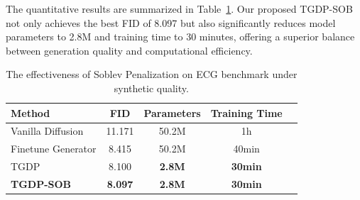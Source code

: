 \documentclass[11pt]{article}
\theoremstyle{plain}
\theoremstyle{definition}
\theoremstyle{remark}
\begin{document}
The quantitative results are summarized in Table~\ref{tab:ecg_quality}. Our proposed TGDP-SOB not only achieves the best FID of 8.097 but also significantly reduces model parameters to 2.8M and training time to 30 minutes, offering a superior balance between generation quality and computational efficiency.

\begin{table}[htbp]
\centering
\caption{The effectiveness of Soblev Penalization on ECG benchmark under synthetic quality.}\label{tab:ecg_quality}
\begin{tabular}{l|c|c|c|c}
\hline
\textbf{Method}
& \textbf{FID}
& \textbf{Parameters}
& \textbf{Training Time} \\
\hline
Vanilla Diffusion       & 11.171 & 50.2M & 1h \\
Finetune Generator      & 8.415 & 50.2M & 40min \\
TGDP          & 8.100 & \textbf{2.8M} &
\textbf{30min} \\
\textbf{TGDP-SOB}  &\textbf{8.097} & \textbf{2.8M} &
\textbf{30min} \\
\hline
\end{tabular}
\end{table}
\end{document}

